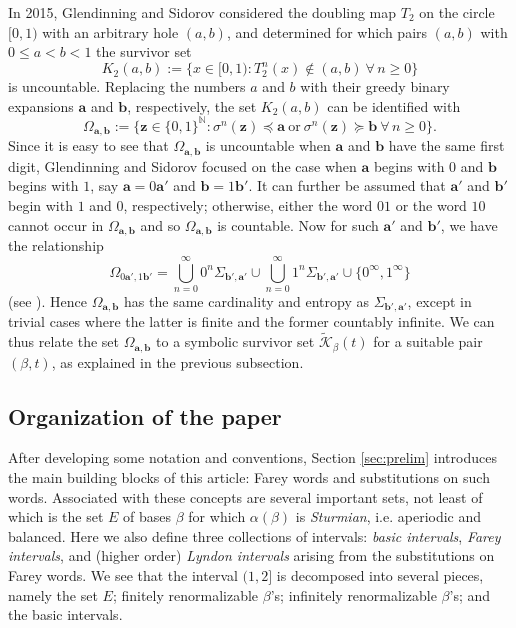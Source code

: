 \documentclass[11pt]{amsart}
\theoremstyle{definition}
\theoremstyle{remark}
\numberwithin{equation}{section}
\newcommand{\N}{\ensuremath{\mathbb{N}}}
\newcommand{\Kt}{\widetilde{\mathcal{K}}}
\renewcommand{\a}{ {\mathbf{a}}}
\renewcommand{\b}{ {\mathbf{b}}}
\newcommand{\z}{\mathbf{z}}
\newcommand{\set}[1]{\left\{#1\right\}}
\newcommand{\f}{\infty}
\newcommand{\al}{\alpha}
\newcommand{\lle}{\preccurlyeq}
\newcommand{\lge}{\succcurlyeq}
\renewcommand{\a}{ \mathbf{a}}
\newcommand{\si}{\sigma}
\begin{document}
In 2015, Glendinning and Sidorov \cite{Glendinning-Sidorov-2015} considered the doubling map $T_2$ on the circle $[0,1)$ with an arbitrary hole $(a,b)$, and determined for which pairs $(a,b)$ with $0\leq a<b<1$ the survivor set
\[
K_2(a,b):=\{x\in[0,1): T_2^n(x)\not\in(a,b)\ \forall\,n\geq 0\}
\]
is uncountable. Replacing the numbers $a$ and $b$ with their greedy binary expansions $\a$ and $\b$, respectively, the set $K_2(a,b)$ can be identified with
\[
\Omega_{\a,\b}:=\{\z\in\{0,1\}^\N: \si^n(\z)\lle \a\ \mbox{or}\ \si^n(\z)\lge \b\ \forall\,n\geq 0\}.
\]
Since it is easy to see that $\Omega_{\a,\b}$ is uncountable when $\a$ and $\b$ have the same first digit, Glendinning and Sidorov focused on the case when $\a$ begins with $0$ and $\b$ begins with $1$, say $\a=0\a'$ and $\b=1\b'$. It can further be assumed that $\a'$ and $\b'$ begin with $1$ and $0$, respectively; {otherwise, either the word $01$ or the word $10$ cannot occur in $\Omega_{\a,\b}$ and so $\Omega_{\a,\b}$ is countable.}
Now for such $\a'$ and $\b'$, we have the relationship
\begin{equation} \label{eq:Omega-and-Sigma}
\Omega_{0\a',1\b'}=\bigcup_{n=0}^\f 0^n\Sigma_{\b',\a'}\cup \bigcup_{n=0}^\f 1^n\Sigma_{\b',\a'}\cup\{0^\f,1^\f\}
\end{equation}
(see \cite[Theorem 2.5 (vi)]{Komornik-Steiner-Zou-2022}). Hence $\Omega_{\a,\b}$ has the same cardinality and entropy as $\Sigma_{\b',\a'}$, except in trivial cases where the latter is finite and the former countably infinite. We can thus relate the set $\Omega_{\a,\b}$ to a symbolic survivor set $\Kt_\beta(t)$ for a suitable pair $(\beta,t)$, as explained in the previous subsection.


\subsection{Organization of the paper}

After developing some notation and conventions, Section \ref{sec:prelim} introduces the main building blocks of this article: Farey words and substitutions on such words. Associated with these concepts are several important sets, not least of which is the set $E$ of bases $\beta$ for which $\al(\beta)$ is {\em Sturmian}, i.e. aperiodic and balanced. Here we also define three collections of intervals: {\em basic intervals}, {\em Farey intervals}, and (higher order) {\em Lyndon intervals} arising from the substitutions on Farey words. We see that the interval $(1,2]$ is decomposed into several pieces, namely the set $E$; finitely renormalizable $\beta$'s; infinitely renormalizable $\beta$'s; and the basic intervals.
\end{document}
